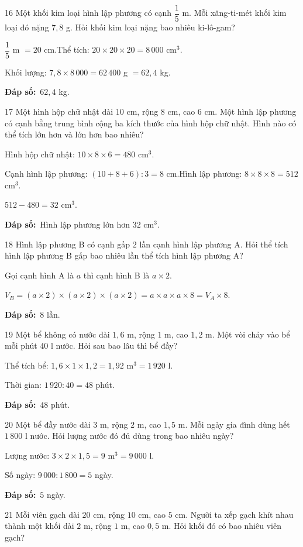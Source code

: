 \documentclass[11pt]{article}
\newif\ifsol \solfalse
\providecommand{\AnsWord}{Đáp số}
\newcommand{\dapso}[1]{\par\textbf{\AnsWord:}\ #1}
\newcommand{\probsol}[1]{%
  \begin{lrbox}{\solmeasure}\begin{minipage}{\dimexpr\linewidth-24pt\relax}#1\end{minipage}\end{lrbox}%
  \ifsol
    \begin{solbox}#1\end{solbox}%
  \else
    \setlength{\solht}{\dimexpr\ht\solmeasure+\dp\solmeasure+0.85cm\relax}%
    \ifdim\solht<1.35cm\setlength{\solht}{1.35cm}\fi
    \begin{tcolorbox}[colback=white,colframe=Line,boxrule=0.8pt,arc=5pt,
      left=8pt,right=8pt,top=4pt,bottom=4pt,height=\solht]{\footnotesize\color{Slate}\itshape\WorkWord}\end{tcolorbox}%
  \fi}
\newcommand{\gap}{\vspace{0.3cm}}
\def\WorkWord{Bài làm:}
\def\AnsWord{Đáp số}
\begin{document}
\gap
\begin{probbox}{16}{\relax}
Một khối kim loại hình lập phương có cạnh $\dfrac15$ m. Mỗi xăng-ti-mét khối kim loại đó nặng $7{,}8$ g. Hỏi khối kim loại nặng bao nhiêu ki-lô-gam?
\end{probbox}
\probsol{
$\dfrac15$ m $=20$ cm.\quad Thể tích: $20\times20\times20=8\,000$ cm$^3$.\par
Khối lượng: $7{,}8\times8\,000=62\,400$ g $=62{,}4$ kg.
\dapso{$62{,}4$ kg.}}
\gap
\begin{probbox}{17}{\relax}
Một hình hộp chữ nhật dài $10$ cm, rộng $8$ cm, cao $6$ cm. Một hình lập phương có cạnh bằng trung bình cộng ba kích thước của hình hộp chữ nhật. Hình nào có thể tích lớn hơn và lớn hơn bao nhiêu?
\end{probbox}
\probsol{
Hình hộp chữ nhật: $10\times8\times6=480$ cm$^3$.\par
Cạnh hình lập phương: $(10+8+6):3=8$ cm.\quad Hình lập phương: $8\times8\times8=512$ cm$^3$.\par
$512-480=32$ cm$^3$.
\dapso{Hình lập phương lớn hơn $32$ cm$^3$.}}
\gap
\begin{probbox}{18}{\relax}
Hình lập phương B có cạnh gấp $2$ lần cạnh hình lập phương A. Hỏi thể tích hình lập phương B gấp bao nhiêu lần thể tích hình lập phương A?
\end{probbox}
\probsol{
Gọi cạnh hình A là $a$ thì cạnh hình B là $a\times2$.\par
$V_B=(a\times2)\times(a\times2)\times(a\times2)=a\times a\times a\times8=V_A\times8$.
\dapso{$8$ lần.}}
\gap
\begin{probbox}{19}{\relax}
Một bể không có nước dài $1{,}6$ m, rộng $1$ m, cao $1{,}2$ m. Một vòi chảy vào bể mỗi phút $40$ l nước. Hỏi sau bao lâu thì bể đầy?
\end{probbox}
\probsol{
Thể tích bể: $1{,}6\times1\times1{,}2=1{,}92$ m$^3=1\,920$ l.\par
Thời gian: $1\,920:40=48$ phút.
\dapso{$48$ phút.}}
\gap
\begin{probbox}{20}{\relax}
Một bể đầy nước dài $3$ m, rộng $2$ m, cao $1{,}5$ m. Mỗi ngày gia đình dùng hết $1\,800$ l nước. Hỏi lượng nước đó đủ dùng trong bao nhiêu ngày?
\end{probbox}
\probsol{
Lượng nước: $3\times2\times1{,}5=9$ m$^3=9\,000$ l.\par
Số ngày: $9\,000:1\,800=5$ ngày.
\dapso{$5$ ngày.}}
\gap
\begin{probbox}{21}{\relax}
Mỗi viên gạch dài $20$ cm, rộng $10$ cm, cao $5$ cm. Người ta xếp gạch khít nhau thành một khối dài $2$ m, rộng $1$ m, cao $0{,}5$ m. Hỏi khối đó có bao nhiêu viên gạch?
\end{probbox}
\end{document}
